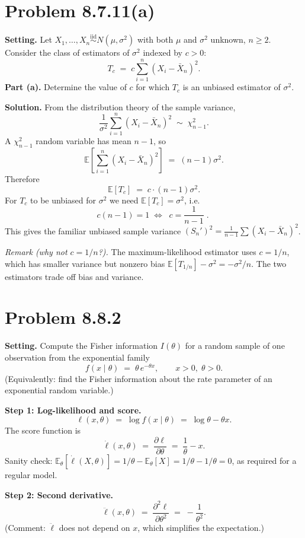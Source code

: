 \documentclass[11pt]{article}
\newcommand{\E}{\mathbb{E}}
\newcommand{\iid}{\stackrel{\text{iid}}{\sim}}
\begin{document}
\section*{Problem 8.7.11(a)}
\textbf{Setting.} Let $X_1,\dots,X_n \iid N(\mu,\sigma^2)$ with both $\mu$ and $\sigma^2$ unknown, $n\ge 2$. Consider the class of estimators of $\sigma^2$ indexed by $c>0$:
\[
T_c \;=\; c\sum_{i=1}^n (X_i - \bar X_n)^2.
\]
\textbf{Part (a).} Determine the value of $c$ for which $T_c$ is an unbiased estimator of $\sigma^2$.

\textbf{Solution.} From the distribution theory of the sample variance,
\[
\frac{1}{\sigma^2}\sum_{i=1}^n (X_i-\bar X_n)^2 \;\sim\; \chi^2_{n-1}.
\]
A $\chi^2_{n-1}$ random variable has mean $n-1$, so
\begin{equation}\label{eq:esumsq}
\E\!\left[\sum_{i=1}^n (X_i - \bar X_n)^2\right] \;=\; (n-1)\sigma^2.
\end{equation}
Therefore
\[
\E[T_c] \;=\; c\cdot (n-1)\sigma^2.
\]
For $T_c$ to be unbiased for $\sigma^2$ we need $\E[T_c]=\sigma^2$, i.e.
\[
c(n-1)=1 \;\Longleftrightarrow\; \boxed{\;c=\frac{1}{n-1}\;.\;}
\]
This gives the familiar unbiased sample variance $(S_n')^2 = \frac{1}{n-1}\sum(X_i-\bar X_n)^2$.

\textit{Remark (why not $c=1/n$?).} The maximum-likelihood estimator uses $c=1/n$, which has smaller variance but nonzero bias $\E[T_{1/n}]-\sigma^2 = -\sigma^2/n$. The two estimators trade off bias and variance.

\bigskip
\section*{Problem 8.8.2}
\textbf{Setting.} Compute the Fisher information $I(\theta)$ for a random sample of one observation from the exponential family
\[
f(x\mid \theta) \;=\; \theta\, e^{-\theta x}, \qquad x>0,\; \theta>0.
\]
(Equivalently: find the Fisher information about the rate parameter of an exponential random variable.)

\textbf{Step 1: Log-likelihood and score.}
\[
\ell(x,\theta) \;=\; \log f(x\mid\theta) \;=\; \log\theta - \theta x.
\]
The score function is
\[
\dot\ell(x,\theta) \;=\; \frac{\partial \ell}{\partial \theta} \;=\; \frac{1}{\theta} - x.
\]
Sanity check: $\E_\theta[\dot\ell(X,\theta)] = 1/\theta - \E_\theta[X] = 1/\theta - 1/\theta = 0$, as required for a regular model.

\textbf{Step 2: Second derivative.}
\[
\ddot\ell(x,\theta) \;=\; \frac{\partial^2 \ell}{\partial \theta^2} \;=\; -\frac{1}{\theta^2}.
\]
(Comment: $\ddot\ell$ does not depend on $x$, which simplifies the expectation.)
\end{document}
